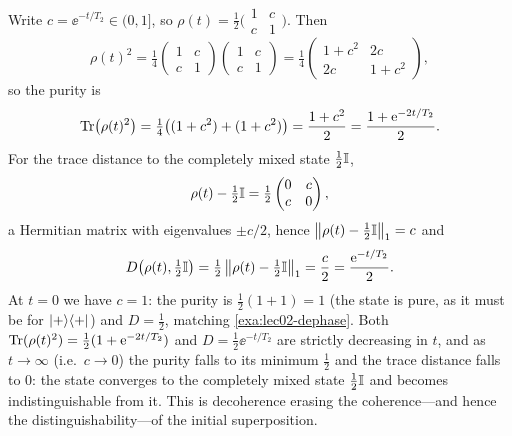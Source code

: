 \begin{solution}
Write $c=\ee^{-t/T_2}\in(0,1]$, so
$\rho(t)=\tfrac12\bigl(\begin{smallmatrix}1&c\\c&1\end{smallmatrix}\bigr)$. Then
\[
  \rho(t)^{2}=\tfrac14\begin{pmatrix}1&c\\c&1\end{pmatrix}
                      \begin{pmatrix}1&c\\c&1\end{pmatrix}
             =\tfrac14\begin{pmatrix}1+c^{2}&2c\\2c&1+c^{2}\end{pmatrix},
\]
so the purity is
\[
  \operatorname{Tr}\bigl(\rho(t)^{2}\bigr)=\tfrac14\bigl((1+c^{2})+(1+c^{2})\bigr)
   =\frac{1+c^{2}}{2}=\frac{1+\mathrm{e}^{-2t/T_2}}{2}.
\]
For the trace distance to the completely mixed state $\tfrac12\mathbb{I}$,
\[
  \rho(t)-\tfrac12\mathbb{I}
   =\tfrac12\begin{pmatrix}0&c\\c&0\end{pmatrix},
\]
a Hermitian matrix with eigenvalues $\pm c/2$, hence
$\left\lVert \rho(t)-\tfrac12\mathbb{I} \right\rVert_1=c$ and
\[
  D\bigl(\rho(t),\tfrac12\mathbb{I}\bigr)=\tfrac12\left\lVert \rho(t)-\tfrac12\mathbb{I} \right\rVert_1
   =\frac{c}{2}=\frac{\mathrm{e}^{-t/T_2}}{2}.
\]
At $t=0$ we have $c=1$: the purity is $\tfrac12(1+1)=1$ (the state is pure, as it must
be for $\ket{+}\!\bra{+}$) and $D=\tfrac12$, matching \cref{exa:lec02-dephase}. Both
$\operatorname{Tr}(\rho(t)^{2})=\tfrac12(1+\mathrm{e}^{-2t/T_2})$ and $D=\tfrac12\ee^{-t/T_2}$ are strictly
decreasing in $t$, and as $t\to\infty$ (i.e.\ $c\to0$) the purity falls to its minimum
$\tfrac12$ and the trace distance falls to $0$: the state converges to the completely
mixed state $\tfrac12\mathbb{I}$ and becomes indistinguishable from it. This is decoherence
erasing the coherence---and hence the distinguishability---of the initial
superposition.
\end{solution}
